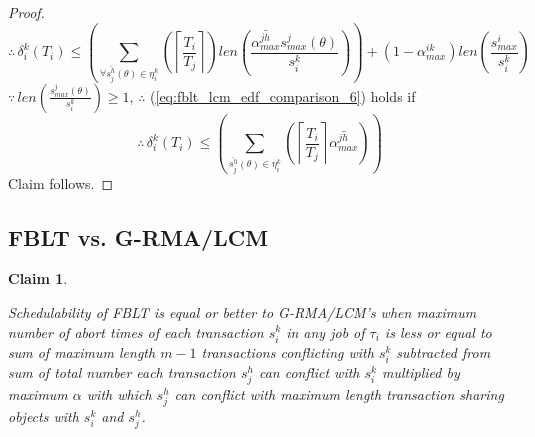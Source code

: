 \documentclass[12pt,english]{report}
\newtheorem{clm}{Claim}
\newtheorem{proof}{Proof}
\begin{document}
\begin{proof}
\begin{equation}
\therefore\,\delta_{i}^{k}(T_{i})\le\left(\sum_{\forall\bar{s_{j}^{h}}(\theta)\in\eta_{i}^{k}}\left(\left\lceil \frac{T_{i}}{T_{j}}\right\rceil \right)len\left(\frac{\bar{\alpha_{max}^{jh}}s_{max}^{j}(\theta)}{s_{i}^{k}}\right)\right)+\left(1-\alpha_{max}^{ik}\right)len\left(\frac{s_{max}^{i}}{s_{i}^{k}}\right)\label{eq:fblt_lcm_edf_comparison_6}
\end{equation}
$\because\, len\left(\frac{s_{max}^{j}(\theta)}{s_{i}^{k}}\right)\ge1$,
$\therefore$ (\ref{eq:fblt_lcm_edf_comparison_6}) holds if 
\begin{equation*}
\therefore\,\delta_{i}^{k}(T_{i})\le\left(\sum_{\bar{s_{j}^{h}}(\theta)\in\eta_{i}^{k}}\left(\left\lceil \frac{T_{i}}{T_{j}}\right\rceil \bar{\alpha_{max}^{jh}}\right)\right)
\end{equation*}
Claim follows.

\end{proof}

\subsection{FBLT vs. G-RMA/LCM}

\begin{clm}\label{clm:fblt_lcm_rma}

Schedulability of FBLT is equal or better to G-RMA/LCM's when maximum
number of abort times of each transaction $s_{i}^{k}$ in any job
of $\tau_{i}$ is less or equal to sum of maximum length $m-1$ transactions
conflicting with $s_{i}^{k}$ subtracted from sum of total number
each transaction $s_{j}^{h}$ can conflict with $s_{i}^{k}$ multiplied by maximum $\alpha$ with which $s_{j}^{h}$ can conflict with maximum length transaction sharing objects with $s_{i}^{k}$
and $s_{j}^{h}$.

\end{clm}
\end{document}
